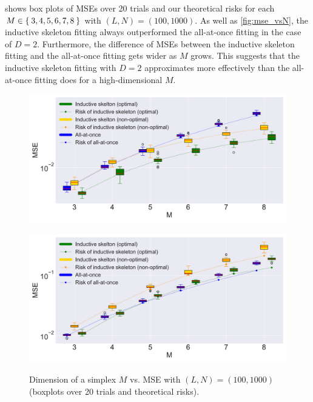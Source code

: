 \documentclass{article}
\begin{document}
 shows box plots of MSEs over 20 trials and our theoretical risks for each $M \in \Set{3, 4, 5, 6, 7, 8}$ with $(L, N) = (100, 1000)$.
As well as \cref{fig:mse_vsN}, the inductive skeleton fitting always outperformed the all-at-once fitting in the case of $D = 2$.
Furthermore, the difference of MSEs between the inductive skeleton fitting and the all-at-once fitting gets wider as $M$ grows.
This suggests that the inductive skeleton fitting with $D = 2$ approximates more effectively than the all-at-once fitting does for a high-dimensional $M$.
\begin{figure}[ht]
 \begin{minipage}{0.49\hsize}
        \centering
    \includegraphics[width=1\textwidth]{neurips2019/fig/D=2_L=100_N=1000.pdf}
        \label{fig:mse_vsM_d2}
 \end{minipage}
 \begin{minipage}{0.49\hsize}
        \centering
    \includegraphics[width=1\textwidth]{neurips2019/fig/D=3_L=100_N=1000.pdf}
        \label{fig:mse_vsM_d3}
 \end{minipage}
 \caption{Dimension of a simplex $M$ vs. MSE with $(L, N) = (100, 1000)$ (boxplots over 20 trials and theoretical risks).}
 \label{fig:mse_vsM}
\end{figure}
\end{document}

